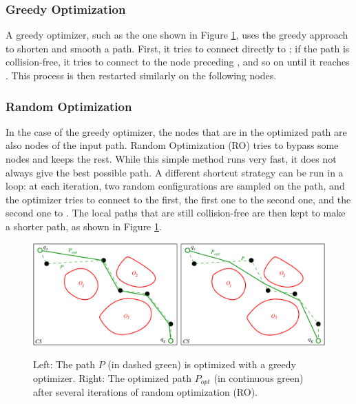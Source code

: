 \subsubsection{Greedy Optimization}

A greedy optimizer, such as the one shown in Figure
\ref{fig:chap1-optimizers}, uses the greedy approach to shorten and
smooth a path. First, it tries to connect directly  to
; if the path is collision-free, it tries to connect
 to the node preceding , and so on until it
reaches . This process is then restarted similarly on the
following nodes.

\subsubsection{Random Optimization}
\label{subsubsec:chap3-random-optimization}

In the case of the greedy optimizer, the nodes that are in the
optimized path are also nodes of the input path. Random Optimization
(RO) tries to bypass some nodes and keeps the rest. While this simple
method runs very fast, it does not always give the best possible
path. A different shortcut strategy can be run in a loop: at each
iteration, two random configurations are sampled on the path, and the
optimizer tries to connect  to the first, the first one to
the second one, and the second one to . The local paths that
are still collision-free are then kept to make a shorter path, as
shown in Figure \ref{fig:chap1-optimizers}.

\begin{figure}
  \centering
      {\includegraphics[width = \linewidth]
        {src/chap1-path-optimization/optimizers.pdf}}
      \caption{Left: The path $P$ (in dashed green) is optimized with
        a greedy optimizer. Right: The optimized path $P_{opt}$ (in
        continuous green) after several iterations of random
        optimization (RO).}
      \label{fig:chap1-optimizers}
\end{figure}

